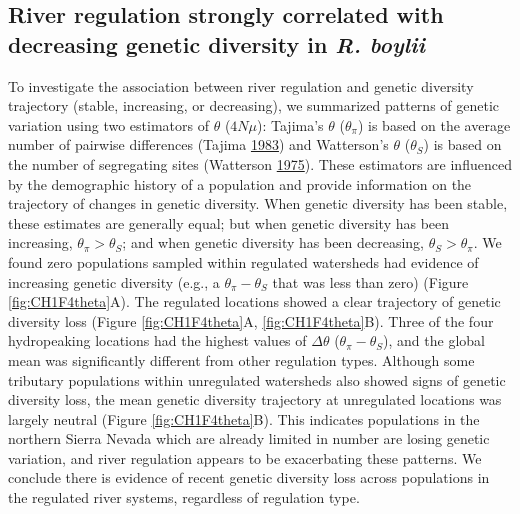 \documentclass[proquest,12pt,final]{ucthesis-CA2012} %
\begin{document}
\begin{ucmainmatter}
\hypertarget{river-regulation-strongly-correlated-with-decreasing-genetic-diversity-in-r.-boylii}{%
\subsection{\texorpdfstring{River regulation strongly correlated with
decreasing genetic diversity in \emph{R.
boylii}}{River regulation strongly correlated with decreasing genetic diversity in R. boylii}}\label{river-regulation-strongly-correlated-with-decreasing-genetic-diversity-in-r.-boylii}}

To investigate the association between river regulation and genetic
diversity trajectory (stable, increasing, or decreasing), we summarized
patterns of genetic variation using two estimators of \(\theta\)
(\(4N\mu\)): Tajima's \(\theta\) (\(\theta_\pi\)) is based on the
average number of pairwise differences (Tajima
\protect\hyperlink{ref-tajima_evolutionary_1983}{1983}) and Watterson's
\(\theta\) (\(\theta_S\)) is based on the number of segregating sites
(Watterson \protect\hyperlink{ref-watterson_number_1975}{1975}). These
estimators are influenced by the demographic history of a population and
provide information on the trajectory of changes in genetic diversity.
When genetic diversity has been stable, these estimates are generally
equal; but when genetic diversity has been increasing,
\(\theta_\pi > \theta_S\); and when genetic diversity has been
decreasing, \(\theta_S > \theta_\pi\). We found zero populations sampled
within regulated watersheds had evidence of increasing genetic diversity
(e.g., a \(\theta_\pi - \theta_S\) that was less than zero) (Figure
\ref{fig:CH1F4theta}A). The regulated locations showed a clear
trajectory of genetic diversity loss (Figure \ref{fig:CH1F4theta}A,
\ref{fig:CH1F4theta}B). Three of the four hydropeaking locations had the
highest values of \(\Delta\theta\) (\(\theta_\pi - \theta_S\)), and the
global mean was significantly different from other regulation types.
Although some tributary populations within unregulated watersheds also
showed signs of genetic diversity loss, the mean genetic diversity
trajectory at unregulated locations was largely neutral (Figure
\ref{fig:CH1F4theta}B). This indicates populations in the northern
Sierra Nevada which are already limited in number are losing genetic
variation, and river regulation appears to be exacerbating these
patterns. We conclude there is evidence of recent genetic diversity loss
across populations in the regulated river systems, regardless of
regulation type.











\end{ucmainmatter}
\end{document}
